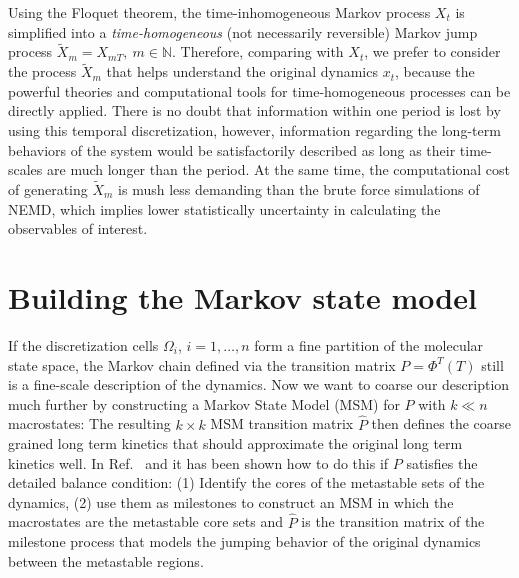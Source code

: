 \documentclass[aps, pre, preprint,unsortedaddress,a4paper,onecolumn]{revtex4}
\newcommand{\vect}[1]{#1}
\newcommand{\myphi}{\Phi}
\begin{document}
Using the Floquet theorem, the time-inhomogeneous Markov process $X_t$
is simplified into a \emph{time-homogeneous} (not necessarily
reversible) Markov jump process $\tilde X_{m} = X_{mT}, \ m\in\mathbb
N$.
Therefore, comparing with $X_t$, we prefer to consider the process $\tilde X_{m}$
that helps understand the original dynamics $x_t$, because the powerful theories and
computational tools for time-homogeneous processes can be directly applied.
There is no doubt that information within one period is lost by using this temporal
discretization, however, information regarding the long-term behaviors
of the system would be satisfactorily described as long as their time-scales
are much longer than the period.
At the same time,
the computational cost of generating $\tilde X_{m}$ is mush less demanding
than the brute force simulations of NEMD, which implies lower
statistically uncertainty in calculating the observables of interest.

\section{Building the Markov state model}
\label{sec:build-msm}

If the discretization cells $\Omega_i$, $i=1,\ldots,n$ form a fine
partition of the molecular state space, the Markov chain defined via
the transition matrix $\vect P=\myphi^T(T)$ still is a fine-scale description of the
dynamics.  Now we want to coarse our description much further by
constructing a Markov State Model (MSM) for $\vect P$ with $k\ll n$
macrostates: The resulting $k\times k$ MSM transition matrix $\hat{\vect P}$
then defines the coarse grained long term kinetics that should
approximate the original long term kinetics well. In Ref.~\cite{sarich2010approximation}
and \cite{schuette2011markov} it
has been shown how to do this if $\vect P$ satisfies the detailed balance
condition: (1) Identify the cores of the metastable sets of the
dynamics, (2) use them as milestones to construct an MSM in which the
macrostates are the metastable core sets and $\hat{\vect P}$ is the transition
matrix of the milestone process that models the jumping behavior of
the original dynamics between the metastable regions.
\end{document}
